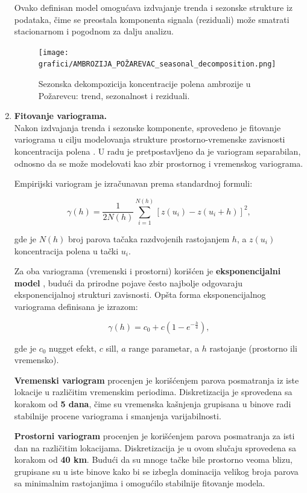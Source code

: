 \documentclass[12pt]{article}
\begin{document}
\begin{enumerate}
    Ovako definisan model omogućava izdvajanje trenda i sezonske strukture iz podataka, čime se preostala komponenta signala (reziduali) može smatrati stacionarnom i pogodnom za dalju analizu. 
    
    \begin{figure}[H]
        \centering
        \texttt{[image: grafici/AMBROZIJA\_POŽAREVAC\_seasonal\_decomposition.png]}
        \caption{Sezonska dekompozicija koncentracije polena ambrozije u Požarevcu: trend, sezonalnost i reziduali.}
        \label{fig:seasonal_decomposition}
    \end{figure}

    \item \textbf{Fitovanje variograma.} \\

    Nakon izdvajanja trenda i sezonske komponente, sprovedeno je fitovanje variograma u cilju modelovanja strukture prostorno-vremenske zavisnosti koncentracija polena \cite{cressie1993statistics, chiles2009geostatistics}. U radu je pretpostavljeno da je variogram separabilan, odnosno da se može modelovati kao zbir prostornog i vremenskog variograma.

    Empirijski variogram je izračunavan prema standardnoj formuli:

    \[
    \gamma(h) = \frac{1}{2N(h)} \sum_{i=1}^{N(h)} \left[ z(u_i) - z(u_i + h) \right]^2,
    \]

    gde je $N(h)$ broj parova tačaka razdvojenih rastojanjem $h$, a $z(u_i)$ koncentracija polena u tački $u_i$.

    Za oba variograma (vremenski i prostorni) korišćen je \textbf{eksponencijalni model} \cite{chiles2009geostatistics}, budući da prirodne pojave često najbolje odgovaraju eksponencijalnoj strukturi zavisnosti. Opšta forma eksponencijalnog variograma definisana je izrazom:

    \[
    \gamma(h) = c_0 + c \left( 1 - e^{-\frac{h}{a}} \right),
    \]

    gde je $c_0$ nugget efekt, $c$ sill, $a$ range parametar, a $h$ rastojanje (prostorno ili vremensko).

    \textbf{Vremenski variogram} procenjen je korišćenjem parova posmatranja iz iste lokacije u različitim vremenskim periodima. Diskretizacija je sprovedena sa korakom od \textbf{5 dana}, čime su vremenska kašnjenja grupisana u binove radi stabilnije procene variograma i smanjenja varijabilnosti.

    \textbf{Prostorni variogram} procenjen je korišćenjem parova posmatranja za isti dan na različitim lokacijama. Diskretizacija je u ovom slučaju sprovedena sa korakom od \textbf{40 km}. Budući da su mnoge tačke bile prostorno veoma blizu, grupisane su u iste binove kako bi se izbegla dominacija velikog broja parova sa minimalnim rastojanjima i omogućilo stabilnije fitovanje modela.


\end{enumerate}
\end{document}
